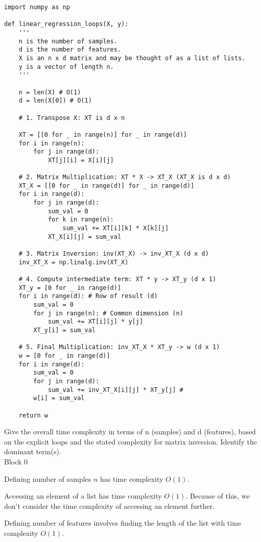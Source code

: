 \documentclass{article}
\begin{document}
\begin{verbatim}
import numpy as np

def linear_regression_loops(X, y):
    '''
    n is the number of samples.
    d is the number of features.
    X is an n x d matrix and may be thought of as a list of lists.
    y is a vector of length n.
    '''
    
    n = len(X) # O(1)
    d = len(X[0]) # O(1)

    # 1. Transpose X: XT is d x n
    
    XT = [[0 for _ in range(n)] for _ in range(d)]
    for i in range(n):
        for j in range(d):
            XT[j][i] = X[i][j]

    # 2. Matrix Multiplication: XT * X -> XT_X (XT_X is d x d)
    XT_X = [[0 for _ in range(d)] for _ in range(d)]
    for i in range(d):
        for j in range(d):
            sum_val = 0
            for k in range(n):
                sum_val += XT[i][k] * X[k][j]
            XT_X[i][j] = sum_val

    # 3. Matrix Inversion: inv(XT_X) -> inv_XT_X (d x d)
    inv_XT_X = np.linalg.inv(XT_X)

    # 4. Compute intermediate term: XT * y -> XT_y (d x 1)
    XT_y = [0 for _ in range(d)]
    for i in range(d): # Row of result (d)
        sum_val = 0
        for j in range(n): # Common dimension (n)
            sum_val += XT[i][j] * y[j]
        XT_y[i] = sum_val

    # 5. Final Multiplication: inv_XT_X * XT_y -> w (d x 1)
    w = [0 for _ in range(d)]
    for i in range(d):
        sum_val = 0
        for j in range(d):
            sum_val += inv_XT_X[i][j] * XT_y[j] #
        w[i] = sum_val

    return w
\end{verbatim}

Give the overall time complexity in terms of n (samples) and d (features), based on the explicit loops and the stated complexity for matrix inversion. Identify the dominant term(s).\\

Block 0

Defining number of samples $n$ has time complexity $O(1)$.

Accessing an element of a list has time complexity $O(1)$. Because of this, we don't consider the time complexity of accessing an element further.

Defining number of features involves finding the length of the list with time complexity $O(1)$.
\end{document}
